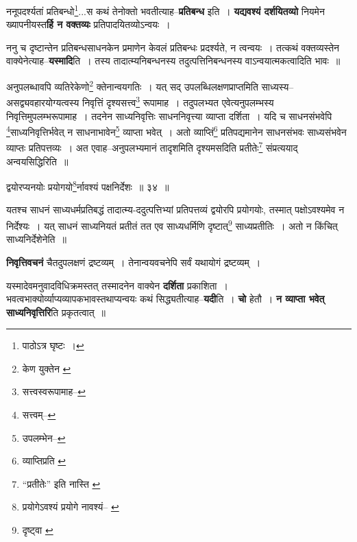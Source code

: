 \documentclass[article,12pt,a4paper]{memoir}
\begin{document}
	  \pstart ननूपदर्श्यतां प्रतिबन्धो\footnote{पाठोऽत्र घृष्टः ।}...स कथं तेनोक्तो भवतीत्याह--\textbf{प्रतिबन्ध} इति । \textbf{यद्यवश्यं दर्शयितव्यो} नियमेन ख्यापनीयस्त\textbf{र्हि न वक्तव्यः} प्रतिपादयितव्योऽन्वयः ।
	\pend
      

	  \pstart ननु च दृष्टान्तेन प्रतिबन्धसाधनकेन प्रमाणेन केवलं प्रतिबन्धः प्रदर्श्यते, न त्वन्वयः । तत्कथं वक्तव्यस्तेन वाक्येनेत्याह--\textbf{यस्मादि}ति । तस्य तादात्म्यनिबन्धनस्य तदुत्पत्तिनिबन्धनस्य वाऽन्वयात्मकत्वादिति भावः ॥
	\pend
      \leavevmode{}
	  \bigskip
	  \begingroup
	

	  \pstart अनुपलब्धावपि व्यतिरेकेणो\footnote{केण युक्तेन \cite{dp-msB}} क्तेनान्वयगतिः । यत् सद् उपलब्धिलक्षणप्राप्तमिति साध्यस्य--असद्व्यवहारयोग्यत्वस्य निवृत्तिं दृश्यसत्त्व\footnote{सत्त्वस्वरूपामाह--\cite{dp-msC}} रूपामाह । तदुपलभ्यत एवेत्यनुपलम्भस्य निवृत्तिमुपलम्भरूपामाह । तदनेन साध्यनिवृत्तिः साधननिवृत्त्या व्याप्ता दर्शिता । यदि च साधनसंभवेपि \footnote{सत्त्वम्--\cite{dp-msD-n}}साध्यनिवृत्तिर्भवेत् न साधनाभावेन\footnote{उपलम्भेन--\cite{dp-msD-n}} व्याप्ता भवेत् । अतो व्याप्तिं\footnote{व्याप्तिप्रति \cite{dp-msA}} प्रतिपद्यमानेन साधनसंभवः साध्यसंभवेन व्याप्तः प्रतिपत्तव्यः । अत एवाह--अनुपलभ्यमानं तादृशमिति दृश्यमसदिति प्रतीतेः\footnote{“प्रतीतेः” इति नास्ति \cite{dp-msA}} संप्रत्ययाद् अन्वयसिद्धिरिति ॥
	\pend
       
	  \bigskip
	  \begingroup
	

	  \pstart द्वयोरप्यनयोः प्रयोगयो\footnote{प्रयोगेऽवश्यं \cite{dp-msB} \cite{dp-edP} \cite{dp-edH} प्रयोगे नावश्यं--\cite{dp-edE} \cite{dp-edN}}र्नावश्यं पक्षनिर्देशः ॥ ३४ ॥
	\pend
      
	  \endgroup
	 

	  \pstart यतश्च साधनं साध्यधर्मप्रतिबद्धं तादात्म्य-ददुत्पत्तिभ्यां प्रतिपत्तव्यं द्वयोरपि प्रयोगयोः, तस्मात् पक्षोऽवश्यमेव न निर्देश्यः । यत् साधनं साध्यनियतं प्रतीतं तत एव साध्यधर्मिणि दृष्टात्\footnote{दृष्ट्वा \cite{dp-msA} \cite{dp-edP} \cite{dp-edH}} साध्यप्रतीतिः । अतो न किंचित् साध्यनिर्देशेनेति ॥
	\pend
      
	  \endgroup
	

	  \pstart \textbf{निवृत्तिवचनं} चैतदुपलक्षणं द्रष्टव्यम् । तेनान्वयवचनेपि सर्वं यथायोगं द्रष्टव्यम् ।
	\pend
      

	  \pstart यस्मादेवमनुवादविधिक्रमस्तत् तस्मादनेन वाक्येन \textbf{दर्शिता} प्रकाशिता । भवत्वभाक्योर्व्याप्यव्यापकभावस्तथाप्यन्वयः कथं सिद्ध्यतीत्याह--\textbf{यदी}ति । \textbf{चो} हेतौ । \textbf{न व्याप्ता भवेत् साध्यनिवृत्तिरि}ति प्रकृतत्वात् ॥
	\pend
      
\end{document}

